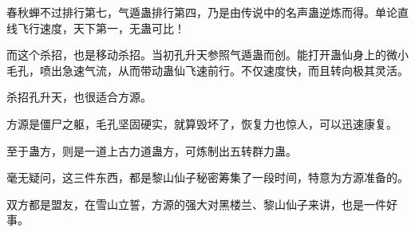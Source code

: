 \begin{this_body}
春秋蝉不过排行第七，气遁蛊排行第四，乃是由传说中的名声蛊逆炼而得。单论直线飞行速度，天下第一，无蛊可比！

而这个杀招，也是移动杀招。当初孔升天参照气遁蛊而创。能打开蛊仙身上的微小毛孔，喷出急速气流，从而带动蛊仙飞速前行。不仅速度快，而且转向极其灵活。

杀招孔升天，也很适合方源。

方源是僵尸之躯，毛孔坚固硬实，就算毁坏了，恢复力也惊人，可以迅速康复。

至于蛊方，则是一道上古力道蛊方，可炼制出五转群力蛊。

毫无疑问，这三件东西，都是黎山仙子秘密筹集了一段时间，特意为方源准备的。

双方都是盟友，在雪山立誓，方源的强大对黑楼兰、黎山仙子来讲，也是一件好事。

\end{this_body}

